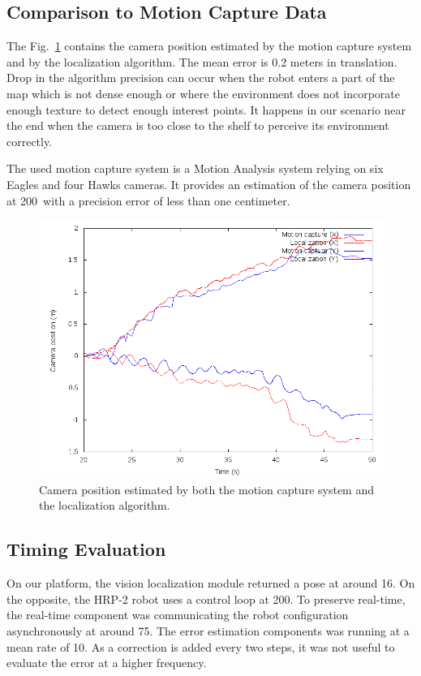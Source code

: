 \subsection{Comparison to Motion Capture Data}\label{sec:mocap}

The Fig.~\ref{tab:mocap_comparison} contains the camera position
estimated by the motion capture system and by the localization
algorithm. The mean error is 0.2 meters in translation. Drop in the
algorithm precision can occur when the robot enters a part of the map
which is not dense enough or where the environment does not
incorporate enough texture to detect enough interest points. It
happens in our scenario near the end when the camera is too close to
the shelf to perceive its environment correctly.

The used motion capture system is a Motion Analysis system relying on
six Eagles and four Hawks cameras. It provides an estimation of the
camera position at 200\hertz~with a precision error of less than one
centimeter.

\begin{figure}[ht!]
  \begin{center}
    \includegraphics[width=\linewidth]{data/mocap.png}
  \end{center}
  \caption{Camera position estimated by both the motion capture system
    and the localization algorithm. \label{tab:mocap_comparison}}
\end{figure}

\subsection{Timing Evaluation}\label{sec:timing}

On our platform, the vision localization module returned a pose at
around 16\hertz. On the opposite, the HRP-2 robot uses a control loop
at 200\hertz. To preserve real-time, the real-time component was
communicating the robot configuration asynchronously at around
75\hertz. The error estimation components was running at a mean rate
of 10\hertz. As a correction is added every two steps, it was not
useful to evaluate the error at a higher frequency.


